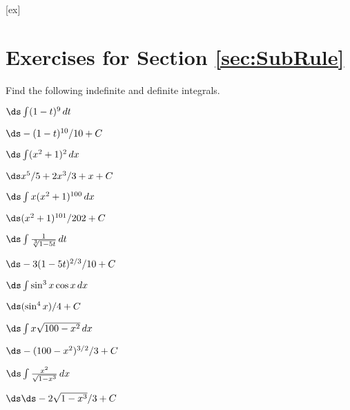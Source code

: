 [ex]
\section*{Exercises for Section \ref{sec:SubRule}}

\begin{enumialphparenastyle}

Find the following indefinite and definite integrals.

\begin{ex}
 $\ds\int (1-t)^9\,dt$
\begin{sol}
 $\ds -(1-t)^{10}/10+C$
\end{sol}
\end{ex}

\begin{ex}
 $\ds\int (x^2+1)^2\,dx$
\begin{sol}
 $\ds x^5/5+2x^3/3+x+C$
\end{sol}
\end{ex}

\begin{ex}
 $\ds\int x(x^2+1)^{100}\,dx$
\begin{sol}
 $\ds (x^2+1)^{101}/202+C$
\end{sol}
\end{ex}

\begin{ex}
 $\ds\int {1\over\root 3 \of {1-5t}}\,dt$ 
\begin{sol}
 $\ds -3(1-5t)^{2/3}/10+C$
\end{sol}
\end{ex}

\begin{ex}
 $\ds\int \sin^3x\cos x\,dx$
\begin{sol}
 $\ds (\sin^4x)/4+C$
\end{sol}
\end{ex}

\begin{ex}
 $\ds\int x\sqrt{100-x^2}\,dx$
\begin{sol}
 $\ds -(100-x^2)^{3/2}/3+C$
\end{sol}
\end{ex}

\begin{ex}
 $\ds\int {x^2\over\sqrt{1-x^3}}\,dx$
\begin{sol}
 $\ds \ds -2\sqrt{1-x^3}/3+C$
\end{sol}
\end{ex}


\end{enumialphparenastyle}
